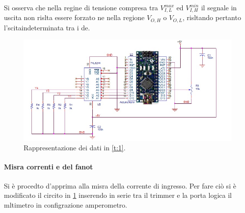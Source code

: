 	 Si osserva che nella regine di tensione compresa tra 	$V_{I,L}^{max}$ ed $V_{I,H}^{min}$ il segnale in uscita non rislta essere forzato ne nella regione $V_{O,H}$ o $V_{O,L}$, risltando pertanto  l'scitaindeterminata tra i de.
	\begin{center}
		\begin{figure}[h]
			\includegraphics[scale=0.50]{imp.png}
			\caption{Rappresentazione dei dati in \tablename{ \ref{t:1}}.}
			\label{f:i1}
		\end{figure}
	\end{center}
\paragraph{Misra correnti e del fanot}
	Si è procedto d'apprima alla misra della corrente di ingresso.
	Per fare ciò si è modificato il circito in \figurename{ \ref{f:i1}} inserendo in serie tra il trimmer e la porta logica il mltimetro in configrazione amperometro.
	
